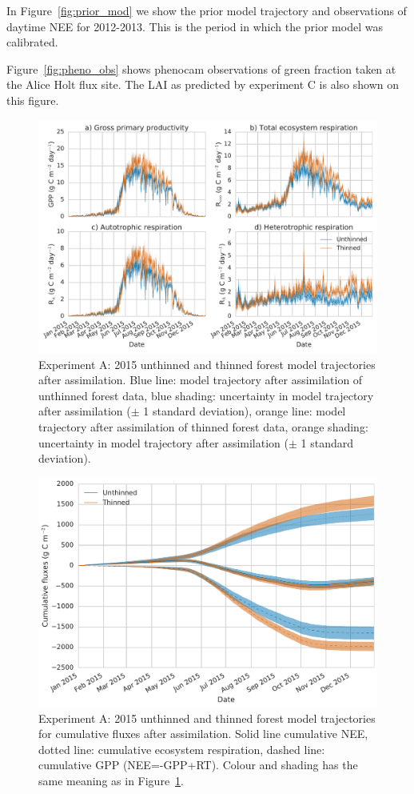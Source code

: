 In Figure~\ref{fig:prior_mod} we show the prior model trajectory and observations of daytime NEE for 2012-2013. This is the period in which the prior model was calibrated.

Figure~\ref{fig:pheno_obs} shows phenocam observations of green fraction taken at the Alice Holt flux site. The LAI as predicted by experiment C is also shown on this figure.

 
\begin{figure}
 \noindent\includegraphics[width=40pc]{chapter/chapter7/flux_compa.pdf}
\caption{Experiment A: 2015 unthinned and thinned forest model trajectories after assimilation. Blue line: model trajectory after assimilation of unthinned forest data, blue shading: uncertainty in model trajectory after assimilation (\(\pm\) 1 standard deviation), orange line: model trajectory after assimilation of thinned forest data, orange shading: uncertainty in model trajectory after assimilation (\(\pm\) 1 standard deviation).}
 \label{fig:fluxcompa}
 \end{figure}
 
 \begin{figure}
 \noindent\includegraphics[width=40pc]{chapter/chapter7/cum_fluxa.pdf}
\caption{Experiment A: 2015 unthinned and thinned forest model trajectories for cumulative fluxes after assimilation. Solid line cumulative NEE, dotted line: cumulative ecosystem respiration, dashed line: cumulative GPP (NEE=-GPP+RT). Colour and shading has the same meaning as in Figure~\ref{fig:fluxcompa}.}
 \label{fig:fluxcuma}
 \end{figure}


